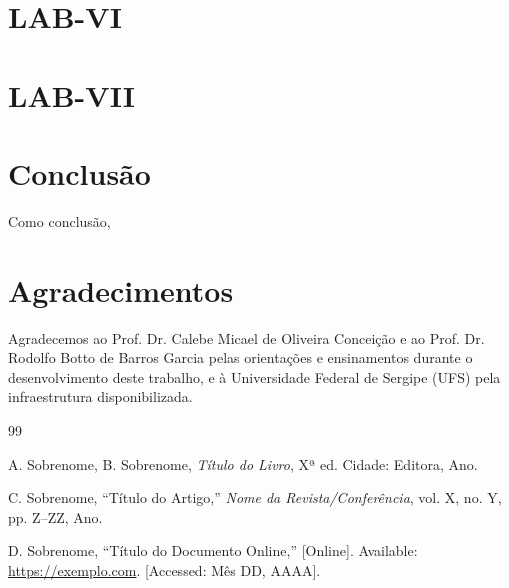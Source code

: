 \documentclass[conference]{IEEEtran}
\begin{document}
\section*{LAB-VI}



\section*{LAB-VII}



\section*{Conclusão}

Como conclusão, 

\section*{Agradecimentos}

Agradecemos ao Prof. Dr. Calebe Micael de Oliveira Conceição e ao Prof. Dr. Rodolfo Botto de Barros Garcia pelas orientações 
e ensinamentos durante o  desenvolvimento deste trabalho, e à Universidade Federal de Sergipe (UFS) pela infraestrutura 
disponibilizada.

\begin{thebibliography}{99}

A. Sobrenome, B. Sobrenome, \textit{Título do Livro}, Xª ed. Cidade: Editora, Ano.

C. Sobrenome, ``Título do Artigo,'' \textit{Nome da Revista/Conferência}, vol. X, no. Y, pp. Z--ZZ, Ano.

D. Sobrenome, ``Título do Documento Online,'' [Online]. Available: \url{https://exemplo.com}. [Accessed: Mês DD, AAAA].

\end{thebibliography}
\end{document}

